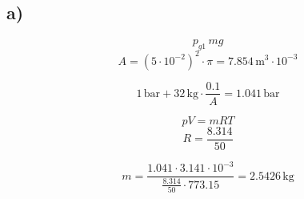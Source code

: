 

\subsection*{a)}
\[ p_{g1} \, mg \]
\[ A = (5 \cdot 10^{-2})^2 \cdot \pi = 7.854 \, \text{m}^3 \cdot 10^{-3} \]

\[ 1 \, \text{bar} + 32 \, \text{kg} \cdot \frac{0.1}{A} = 1.041 \, \text{bar} \]

\[ pV = mRT \]
\[ R = \frac{8.314}{50} \]

\[ m = \frac{1.041 \cdot 3.141 \cdot 10^{-3}}{\frac{8.314}{50} \cdot 773.15} = 2.5426 \, \text{kg} \]